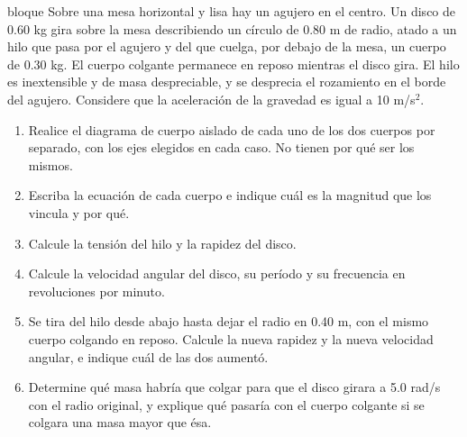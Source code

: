 \documentclass[11pt,openany]{book}
\begin{document}
\begin{ejercicio}{bloque}
Sobre una mesa horizontal y lisa hay un agujero en el centro. Un disco de 0.60 kg gira sobre la mesa describiendo un círculo de 0.80 m de radio, atado a un hilo que pasa por el agujero y del que cuelga, por debajo de la mesa, un cuerpo de 0.30 kg. El cuerpo colgante permanece en reposo mientras el disco gira. El hilo es inextensible y de masa despreciable, y se desprecia el rozamiento en el borde del agujero. Considere que la aceleración de la gravedad es igual a 10 m/s$^2$.
\begin{enumerate}[label=(\alph*), leftmargin=1.7em, itemsep=1pt, topsep=3pt]
  \item Realice el diagrama de cuerpo aislado de cada uno de los dos cuerpos por separado, con los ejes elegidos en cada caso. No tienen por qué ser los mismos.
  \item Escriba la ecuación de cada cuerpo e indique cuál es la magnitud que los vincula y por qué.
  \item Calcule la tensión del hilo y la rapidez del disco.
  \item Calcule la velocidad angular del disco, su período y su frecuencia en revoluciones por minuto.
  \item Se tira del hilo desde abajo hasta dejar el radio en 0.40 m, con el mismo cuerpo colgando en reposo. Calcule la nueva rapidez y la nueva velocidad angular, e indique cuál de las dos aumentó.
  \item Determine qué masa habría que colgar para que el disco girara a 5.0 rad/s con el radio original, y explique qué pasaría con el cuerpo colgante si se colgara una masa mayor que ésa.
\end{enumerate}
\end{ejercicio}
\end{document}

